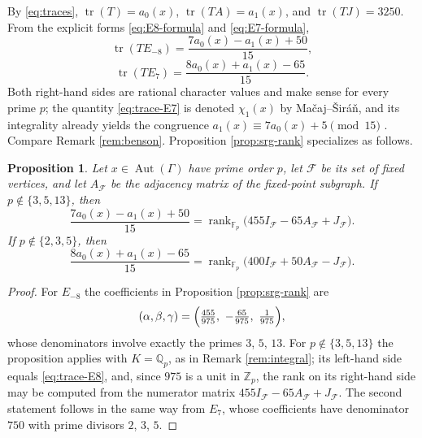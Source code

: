 \documentclass[11pt]{article}
\theoremstyle{plain}
\newtheorem{proposition}[theorem]{Proposition}
\theoremstyle{remark}
\newcommand{\Aut}{\operatorname{Aut}}
\newcommand{\tr}{\operatorname{tr}}
\newcommand{\rank}{\operatorname{rank}}
\newcommand{\Zp}{\mathbb Z_p}
\newcommand{\Qp}{\mathbb Q_p}
\newcommand{\Fp}{\mathbb F_p}
\begin{document}
By \eqref{eq:traces}, $\tr(T)=a_0(x)$, $\tr(TA)=a_1(x)$, and $\tr(TJ)=3250$.
From the explicit forms \eqref{eq:E8-formula} and \eqref{eq:E7-formula},
\begin{equation}\label{eq:trace-E8}
 \tr(TE_{-8})=\frac{7a_0(x)-a_1(x)+50}{15},
\end{equation}
\begin{equation}\label{eq:trace-E7}
 \tr(TE_{7})=\frac{8a_0(x)+a_1(x)-65}{15}.
\end{equation}
Both right-hand sides are rational character values and make sense for every prime $p$;
the quantity \eqref{eq:trace-E7} is denoted $\chi_1(x)$ by Ma\v{c}aj--\v{S}ir\'a\v{n},
and its integrality already yields the congruence $a_1(x)\equiv 7a_0(x)+5\pmod{15}$ \cite[Lemma 3]{MacajSiran}.
Compare Remark \ref{rem:benson}.
Proposition \ref{prop:srg-rank} specializes as follows.

\begin{proposition}\label{prop:trace-rank}
Let $x\in\Aut(\Gamma)$ have prime order $p$, let $\mathcal F$ be its set of fixed vertices,
and let $A_{\mathcal F}$ be the adjacency matrix of the fixed-point subgraph.
If $p\notin\{3,5,13\}$, then
\[
 \frac{7a_0(x)-a_1(x)+50}{15}
 =\rank_{\Fp}\bigl(455I_{\mathcal F}-65A_{\mathcal F}+J_{\mathcal F}\bigr).
\]
If $p\notin\{2,3,5\}$, then
\[
 \frac{8a_0(x)+a_1(x)-65}{15}
 =\rank_{\Fp}\bigl(400I_{\mathcal F}+50A_{\mathcal F}-J_{\mathcal F}\bigr).
\]
\end{proposition}

\begin{proof}
For $E_{-8}$ the coefficients in Proposition \ref{prop:srg-rank} are
\[
 (\alpha,\beta,\gamma)=\Bigl(\tfrac{455}{975},\ -\tfrac{65}{975},\ \tfrac{1}{975}\Bigr),
\]
whose denominators involve exactly the primes $3$, $5$, $13$.
For $p\notin\{3,5,13\}$ the proposition applies with $K=\Qp$, as in Remark \ref{rem:integral};
its left-hand side equals \eqref{eq:trace-E8}, and, since $975$ is a unit in $\Zp$,
the rank on its right-hand side may be computed from the numerator matrix $455I_{\mathcal F}-65A_{\mathcal F}+J_{\mathcal F}$.
The second statement follows in the same way from $E_7$,
whose coefficients have denominator $750$ with prime divisors $2$, $3$, $5$.
\end{proof}
\end{document}
